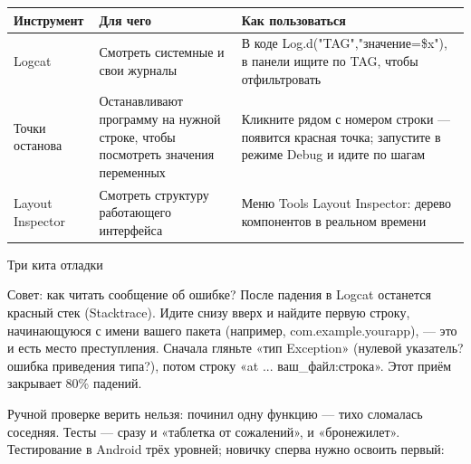 


\begin{center}
\begin{tabularx}{\linewidth}{|X|X|X|}
\hline
\textbf{Инструмент} & \textbf{Для чего} & \textbf{Как пользоваться} \tabularnewline
\hline
Logcat & Смотреть системные и свои журналы & В коде Log.d("TAG","значение=\$x"), в панели ищите по TAG, чтобы отфильтровать \tabularnewline
Точки останова & Останавливают программу на нужной строке, чтобы посмотреть значения переменных & Кликните рядом с номером строки — появится красная точка; запустите в режиме Debug и идите по шагам \tabularnewline
Layout Inspector & Смотреть структуру работающего интерфейса & Меню Tools Layout Inspector: дерево компонентов в реальном времени \tabularnewline
\hline
\end{tabularx}
\end{center}

\begin{center}\small\color{gray}Три кита отладки\end{center}

\begin{tcbinfo}{Совет: как читать сообщение об ошибке?}
После падения в Logcat останется красный стек (Stacktrace). Идите снизу вверх и найдите первую строку, начинающуюся с имени вашего пакета (например, com.example.yourapp), — это и есть место преступления. Сначала гляньте «тип Exception» (нулевой указатель? ошибка приведения типа?), потом строку «at ... ваш\_файл:строка». Этот приём закрывает 80\% падений.

\end{tcbinfo}


Ручной проверке верить нельзя: починил одну функцию — тихо сломалась соседняя. Тесты — сразу и «таблетка от сожалений», и «бронежилет». Тестирование в Android трёх уровней; новичку сперва нужно освоить первый:

